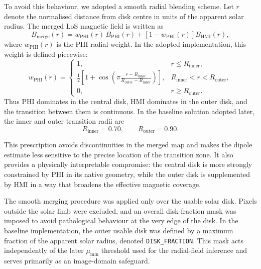 \documentclass[namedreferences,hyperref,optionalrh]{spr-sola}
\begin{document}
To avoid this behaviour, we adopted a smooth radial blending scheme. Let $r$ denote the normalised distance from disk centre in units of the apparent solar radius. The merged LoS magnetic field is written as
\begin{equation}
    B_{\mathrm{merge}}(r)
    =
    w_{\mathrm{PHI}}(r)\,B_{\mathrm{PHI}}(r)
    +
    \left[1-w_{\mathrm{PHI}}(r)\right] B_{\mathrm{HMI}}(r),
\end{equation}
where $w_{\mathrm{PHI}}(r)$ is the PHI radial weight. In the adopted implementation, this weight is defined piecewise:
\begin{equation}
    w_{\mathrm{PHI}}(r)=
    \begin{cases}
        1, & r \le R_{\mathrm{inner}}, \\[4pt]
        \frac{1}{2}\left[1+\cos\left(\pi \frac{r-R_{\mathrm{inner}}}{R_{\mathrm{outer}}-R_{\mathrm{inner}}}\right)\right],
        & R_{\mathrm{inner}} < r < R_{\mathrm{outer}}, \\[6pt]
        0, & r \ge R_{\mathrm{outer}}.
    \end{cases}
\end{equation}
Thus PHI dominates in the central disk, HMI dominates in the outer disk, and the transition between them is continuous. In the baseline solution adopted later, the inner and outer transition radii are
\begin{equation}
    R_{\mathrm{inner}} = 0.70,\qquad R_{\mathrm{outer}} = 0.90.
\end{equation}

This prescription avoids discontinuities in the merged map and makes the dipole estimate less sensitive to the precise location of the transition zone. It also provides a physically interpretable compromise: the central disk is more strongly constrained by PHI in its native geometry, while the outer disk is supplemented by HMI in a way that broadens the effective magnetic coverage.


The smooth merging procedure was applied only over the usable solar disk. Pixels outside the solar limb were excluded, and an overall disk-fraction mask was imposed to avoid pathological behaviour at the very edge of the disk. In the baseline implementation, the outer usable disk was defined by a maximum fraction of the apparent solar radius, denoted \texttt{DISK\_FRACTION}. This mask acts independently of the later $\mu_{\min}$ threshold used for the radial-field inference and serves primarily as an image-domain safeguard.
\end{document}
